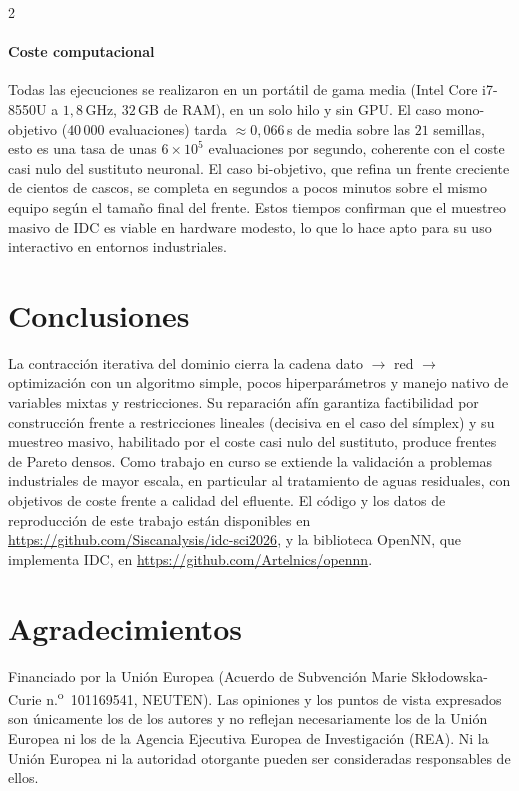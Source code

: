 \documentclass[5p,times,authoryear]{sciarticle}
\begin{document}
\begin{multicols}{2}
\begin{table}[H]
\centering
\caption{Resultado de IDC en el caso \emph{yacht} bi-objetivo:
$|\mathcal{P}|$ (tamaño del frente), HV normalizado en $[0,1]$ ($1=$ ideal)
y el punto recomendado (más cercano al utópico).}
\label{tab:mo}

\end{table}

\paragraph{Coste computacional} Todas las ejecuciones se realizaron en un
portátil de gama media (Intel Core i7-8550U a $1{,}8$\,GHz, $32$\,GB de RAM),
en un solo hilo y sin GPU. El caso mono-objetivo ($40\,000$ evaluaciones)
tarda $\approx\!0{,}066$\,s de media sobre las $21$ semillas, esto es una
tasa de unas $6\!\times\!10^{5}$ evaluaciones por segundo, coherente con el
coste casi nulo del sustituto neuronal. El caso bi-objetivo, que refina un
frente creciente de cientos de cascos, se completa en segundos a pocos
minutos sobre el mismo equipo según el tamaño final del frente. Estos tiempos
confirman que el muestreo masivo de IDC es viable en hardware modesto, lo que
lo hace apto para su uso interactivo en entornos industriales.

\section{Conclusiones}
La contracción iterativa del dominio cierra la cadena dato $\to$ red
$\to$ optimización con un algoritmo simple, pocos hiperparámetros y
manejo nativo de variables mixtas y restricciones. Su reparación afín
garantiza factibilidad por construcción frente a restricciones lineales
(decisiva en el caso del símplex) y su muestreo masivo, habilitado por el
coste casi nulo del sustituto, produce frentes de Pareto densos.
Como trabajo en curso se extiende la validación a problemas industriales
de mayor escala, en particular al tratamiento de aguas residuales, con
objetivos de coste frente a calidad del efluente. El código y los datos de
reproducción de este trabajo están disponibles en
\url{https://github.com/Siscanalysis/idc-sci2026}, y la biblioteca OpenNN,
que implementa IDC, en \url{https://github.com/Artelnics/opennn}.

\section*{Agradecimientos}
Financiado por la Unión Europea (Acuerdo de Subvención Marie
Sk\l{}odowska-Curie n.\textsuperscript{o}~101169541, NEUTEN). Las opiniones
y los puntos de vista expresados son únicamente los de los autores y no
reflejan necesariamente los de la Unión Europea ni los de la Agencia
Ejecutiva Europea de Investigación (REA). Ni la Unión Europea ni la
autoridad otorgante pueden ser consideradas responsables de ellos.




\end{multicols}
\end{document}
